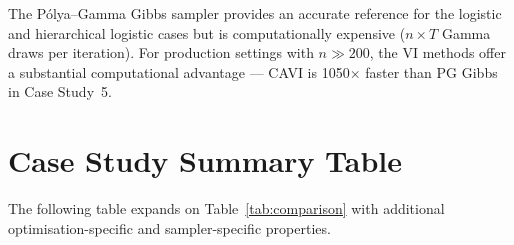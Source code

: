 \documentclass[11pt,a4paper]{article}
\begin{document}
The P\'{o}lya--Gamma Gibbs sampler provides an accurate reference for the logistic
and hierarchical logistic cases but is computationally expensive ($n \times T$
Gamma draws per iteration).
For production settings with $n \gg 200$, the VI methods offer a substantial
computational advantage --- CAVI is 1050$\times$ faster than PG Gibbs in Case Study~5.

\nocite{*}
\printbibliography

\appendix

\section{Case Study Summary Table}
\label{app:comparison-table}

The following table expands on Table~\ref{tab:comparison} with additional
optimisation-specific and sampler-specific properties.
\end{document}
